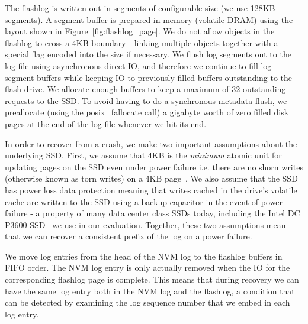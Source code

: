 \documentclass[pageno]{jpaper}
\begin{document}
The flashlog is written out in segments of configurable size (we use 128KB
segments). A segment buffer is prepared in memory (volatile DRAM) using the
layout shown in Figure~\ref{fig:flashlog_page}. We do not allow objects in the
flashlog to cross a 4KB boundary - linking multiple objects together with a
special flag encoded into the size if necessary. We flush log segments out to
the log file using asynchronous direct IO, and therefore we continue to fill log
segment buffers while keeping IO to previously filled buffers outstanding to the
flash drive. We allocate enough buffers to keep a maximum of 32 outstanding
requests to the SSD. To avoid having to do a synchronous metadata flush, we
preallocate (using the posix\_fallocate call) a gigabyte worth of zero filled
disk pages at the end of the log file whenever we hit its end.

In order to recover from a crash, we make two important assumptions about the
underlying SSD. First, we assume that 4KB is the \emph{minimum} atomic unit for
updating pages on the SSD even under power failure i.e. there are no shorn
writes (otherwise known as torn writes) on a 4KB page~\cite{shorn_writes}. We
also assume that the SSD has power loss data protection meaning that writes
cached in the drive's volatile cache are written to the SSD using a backup
capacitor in the event of power failure - a property of many data center class
SSDs today, including the Intel DC P3600 SSD~\cite{ssd_spec} we use in our
evaluation. Together, these two assumptions mean that we can recover a consistent
prefix of the log on a power failure.

We move log entries from the head of the NVM log to the flashlog buffers in FIFO
order. The NVM log entry is only actually removed when the IO for the
corresponding flashlog page is complete. This means that during recovery we can
have the same log entry both in the NVM log and the flashlog, a condition that
can be detected by examining the log sequence number that we embed in each log
entry.
\end{document}
